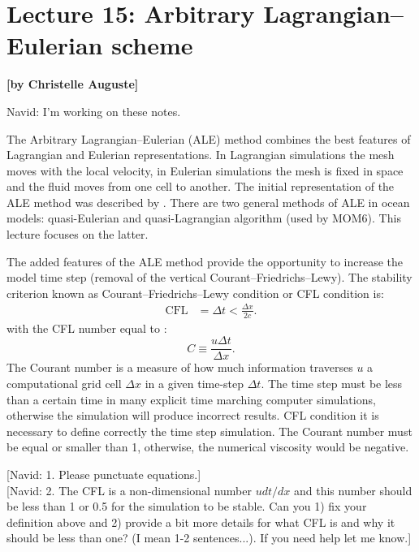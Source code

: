 
\section{Lecture 15:  Arbitrary Lagrangian--Eulerian scheme}
\begin{flushright}\textbf{[by Christelle Auguste]}\end{flushright}

{\color{red} Navid: I'm working on these notes.}

The Arbitrary Lagrangian--Eulerian (ALE) method combines the best features of Lagrangian and Eulerian representations. In Lagrangian simulations the mesh moves with the local velocity, in Eulerian  simulations the mesh is fixed in space and the fluid moves from one cell to another. The initial representation of the ALE method was described by \citet{1974JCoPh..14..227H}. There are two general methods of ALE in ocean models: quasi-Eulerian and quasi-Lagrangian algorithm (used by MOM6). This lecture focuses on the latter.

The added features of the ALE method provide the opportunity to increase the model time step (removal of the vertical Courant--Friedrichs--Lewy). The stability criterion known as Courant--Friedrichs--Lewy condition or CFL condition is:
\begin {align}
\mathrm{CFL}&=\Delta t <\frac{\Delta x}{2c}.
\end{align}
with the CFL number equal to :
\begin{equation}
C \equiv \frac{u \Delta t}{\Delta x}.
\end{equation}
The Courant number is a measure of how much information traverses $u$ a computational grid cell $\Delta x$ in a given time-step $\Delta t$.
The time step must be less than a certain time in many explicit time marching computer simulations, otherwise the simulation will produce incorrect results. CFL condition it is necessary to define correctly the time step simulation. The Courant number must be equal or smaller than 1, otherwise, the numerical viscosity would be negative.

{\color{red}[Navid: 1. Please punctuate equations.]}\\
{\color{red}[Navid: 2. The CFL is a non-dimensional number $u dt/dx$ and this number should be less than 1 or 0.5 for the simulation to be stable. Can you 1) fix your definition above and 2) provide a bit more details for what CFL is and why it should be less than one? (I mean 1-2 sentences...). If you need help let me know.]}\\

